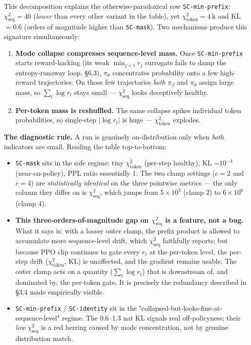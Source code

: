 \documentclass[11pt,a4paper]{article}
\theoremstyle{remark}
\begin{document}
This decomposition explains the otherwise-paradoxical row \texttt{SC-min-prefix}: $\chi^2_{\mathrm{seq}}\!=\!40$ (\emph{lower} than every other variant in the table), yet $\chi^2_{\mathrm{token}}\!=\!4\,\mathrm{k}$ and KL $\!=\!0.6$ (orders of magnitude higher than \texttt{SC-mask}). Two mechanisms produce this signature simultaneously:

\begin{enumerate}[leftmargin=1.2em]
\item \textbf{Mode collapse compresses sequence-level mass.} Once \texttt{SC-min-prefix} starts reward-hacking (its weak $\min_{j<t} r_j$ surrogate fails to damp the entropy-runaway loop, §6.3), $\pi_\theta$ concentrates probability onto a few high-reward trajectories. On those few trajectories \emph{both} $\pi_\beta$ and $\pi_\theta$ assign large mass, so $\sum_t\log r_t$ stays small --- $\chi^2_{\mathrm{seq}}$ looks deceptively healthy.
\item \textbf{Per-token mass is reshuffled.} The same collapse spikes individual token probabilities, so single-step $|\log r_t|$ is huge --- $\chi^2_{\mathrm{token}}$ explodes.
\end{enumerate}

\textbf{The diagnostic rule.} A run is genuinely on-distribution only when \emph{both} indicators are small. Reading the table top-to-bottom:

\begin{itemize}[leftmargin=1.2em]
\item \texttt{SC-mask} sits in the safe regime: tiny $\chi^2_{\mathrm{token}}$ (per-step healthy), KL $\sim\!10^{-4}$ (near-on-policy), PPL ratio essentially 1. The two clamp settings ($c=2$ and $c=4$) are \emph{statistically identical} on the three pointwise metrics --- the only column they differ on is $\chi^2_{\mathrm{seq}}$, which jumps from $5\!\times\!10^{3}$ (clamp 2) to $6\!\times\!10^{6}$ (clamp 4).
\item \textbf{This three-orders-of-magnitude gap on $\chi^2_{\mathrm{seq}}$ is a feature, not a bug.} What it says is: with a looser outer clamp, the prefix product is allowed to accumulate more sequence-level drift, which $\chi^2_{\mathrm{seq}}$ faithfully reports; but because PPO clip continues to gate every $r_t$ at the per-token level, the per-step drift ($\chi^2_{\mathrm{token}}$, KL) is unaffected, and the gradient remains usable. The outer clamp acts on a quantity ($\sum_t\log r_t$) that is downstream of, and dominated by, the per-token gate. It is precisely the redundancy described in §3.4 made empirically visible.
\item \texttt{SC-min-prefix} / \texttt{SC-identity} sit in the "collapsed-but-looks-fine-at-sequence-level" regime. The 0.6--1.3 nat KL signals real off-policyness; their \emph{low} $\chi^2_{\mathrm{seq}}$ is a red herring caused by mode concentration, not by genuine distribution match.
\end{itemize}
\end{document}
